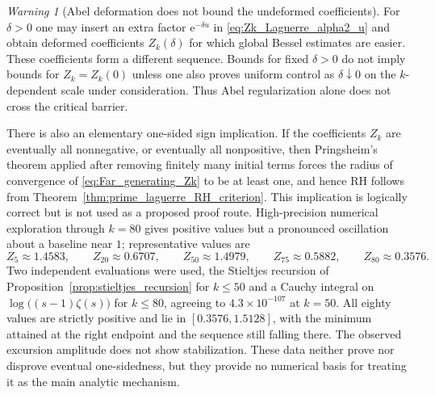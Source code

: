 \documentclass[11pt]{amsart}
\numberwithin{equation}{section}
\theoremstyle{plain}
\theoremstyle{definition}
\theoremstyle{remark}
\newtheorem{warning}[theorem]{Warning}
\newcommand{\RH}{\mathrm{RH}}
\newcommand{\e}{\mathrm e}
\begin{document}
\begin{warning}[Abel deformation does not bound the undeformed coefficients]
\label{warn:delta_deformation_not_bound}
For $\delta>0$ one may insert an extra factor $\e^{-\delta u}$ in \eqref{eq:Zk_Laguerre_alpha2_u} and obtain deformed coefficients $Z_k(\delta)$ for which global Bessel estimates are easier.  These coefficients form a different sequence.  Bounds for fixed $\delta>0$ do not imply bounds for $Z_k=Z_k(0)$ unless one also proves uniform control as $\delta\downarrow0$ on the $k$-dependent scale under consideration.  Thus Abel regularization alone does not cross the critical barrier.
\end{warning}

There is also an elementary one-sided sign implication.  If the coefficients $Z_k$ are eventually all nonnegative, or eventually all nonpositive, then Pringsheim's theorem applied after removing finitely many initial terms forces the radius of convergence of \eqref{eq:Far_generating_Zk} to be at least one, and hence $\RH$ follows from Theorem~\ref{thm:prime_laguerre_RH_criterion}.  This implication is logically correct but is not used as a proposed proof route.  High-precision numerical exploration through $k=80$ gives positive values but a pronounced oscillation about a baseline near $1$; representative values are
\begin{equation}
 Z_5\approx1.4583,\qquad
 Z_{20}\approx0.6707,\qquad
 Z_{50}\approx1.4979,\qquad
 Z_{75}\approx0.5882,\qquad
 Z_{80}\approx0.3576.
 \label{eq:Zk_numerical_oscillation_80}
\end{equation}
Two independent evaluations were used, the Stieltjes recursion of Proposition~\ref{prop:stieltjes_recursion} for $k\le50$ and a Cauchy integral on $\log\bigl((s-1)\zeta(s)\bigr)$ for $k\le80$, agreeing to $4.3\times10^{-107}$ at $k=50$.  All eighty values are strictly positive and lie in $[0.3576,1.5128]$, with the minimum attained at the right endpoint and the sequence still falling there.  The observed excursion amplitude does not show stabilization.  These data neither prove nor disprove eventual one-sidedness, but they provide no numerical basis for treating it as the main analytic mechanism.
\end{document}
